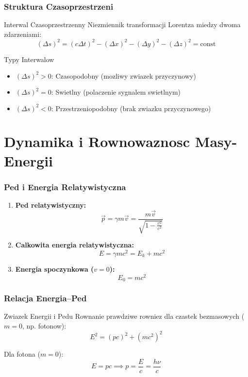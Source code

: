 \documentclass[10pt,aspectratio=169]{beamer}
\begin{document}
\begin{frame}{\frametitle{Struktura Czasoprzestrzeni}}
    \begin{block}{Interwal Czasoprzestrzenny}
        Niezmiennik transformacji Lorentza miedzy dwoma zdarzeniami:
        \[
            (\Delta s)^2 = (c \Delta t)^2 - (\Delta x)^2 - (\Delta y)^2 - (\Delta z)^2 = \text{const}
        \]
    \end{block}

    \begin{alertblock}{Typy Interwalow}
        \begin{itemize}
            \item $(\Delta s)^2 > 0$: Czasopodobny (mozliwy zwiazek przyczynowy)
            \item $(\Delta s)^2 = 0$: Swietlny (polaczenie sygnalem swietlnym)
            \item $(\Delta s)^2 < 0$: Przestrzeniopodobny (brak zwiazku przyczynowego)
        \end{itemize}
    \end{alertblock}
\end{frame}

\section{Dynamika i Rownowaznosc Masy-Energii}
\begin{frame}{\frametitle{Ped i Energia Relatywistyczna}}
    \begin{enumerate}
        \item \textbf{Ped relatywistyczny:}
        \[
            \vec{p} = \gamma m \vec{v} = \frac{m \vec{v}}{\sqrt{1 - \frac{v^2}{c^2}}}
        \]

        \item \textbf{Calkowita energia relatywistyczna:}
        \[
            E = \gamma m c^2 = E_k + m c^2
        \]

        \item \textbf{Energia spoczynkowa ($v=0$):}
        \[
            E_0 = m c^2
        \]
    \end{enumerate}
\end{frame}

\begin{frame}{\frametitle{Relacja Energia--Ped}}
    \begin{block}{Zwiazek Energii i Pedu}
        Rownanie prawdziwe rowniez dla czastek bezmasowych ($m=0$, np. fotonow):
        \[
            E^2 = (p c)^2 + (m c^2)^2
        \]
    \end{block}

    \begin{exampleblock}{Dla fotona ($m=0$):}
        \[
            E = p c \implies p = \frac{E}{c} = \frac{h \nu}{c}
        \]
    \end{exampleblock}
\end{frame}
\end{document}
